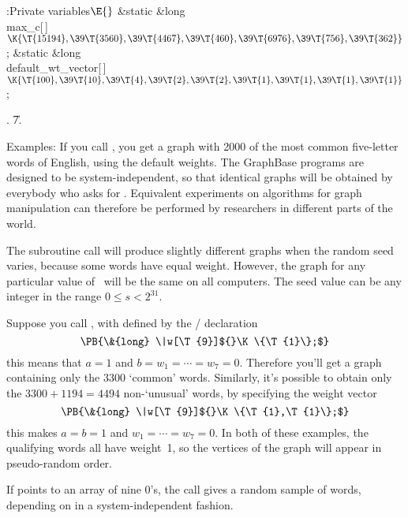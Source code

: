 \Y\B\4:Private variables\X${}\E{}$\6
\&{static} \&{long} \\{max\_c}[\,]${}\K\{\T{15194},\39\T{3560},\39\T{4467},\39%
\T{460},\39\T{6976},\39\T{756},\39\T{362}\}{}$;\6
\&{static} \&{long} \\{default\_wt\_vector}[\,]${}\K\{\T{100},\39\T{10},\39%
\T{4},\39\T{2},\39\T{2},\39\T{1},\39\T{1},\39\T{1},\39\T{1}\}{}$;\par
{}.
\U7.\fi

Examples: If you call , you
get a graph with
2000 of the most common five-letter words of English, using the
default weights.  The GraphBase programs are designed to be
system-independent, so that identical graphs will be obtained by
everybody who asks for .
Equivalent experiments
on algorithms for graph manipulation can therefore be performed by
researchers in different parts of the world.

The subroutine call  will produce
slightly
different graphs when the random seed  varies, because some words
have equal weight. However, the graph for any particular value of~
will be the same on all computers. The seed value can be any integer
in the range $0\le s<2^{31}$.

Suppose you call , with  defined
by the \CEE/ declaration
$$\hbox{\PB{\&{long} \|w[\T{9}]${}\K\{\T{1}\};$}}$$
this means that $a=1$ and $b=w_1=\cdots=w_7=0$. Therefore you'll get a graph
containing only the 3300 `common' words. Similarly, it's possible to obtain
only the $3300+1194=4494$ non-`unusual' words, by specifying the weight vector
$$\hbox{\PB{\&{long} \|w[\T{9}]${}\K\{\T{1},\T{1}\};$}}$$
this makes $a=b=1$ and $w_1=\cdots=w_7=0$. In both of these examples, the
qualifying words all have weight~1, so the vertices of the graph will appear
in pseudo-random order.

If  points to an array of nine 0's, the call  gives a
random sample of  words, depending on  in a system-independent
fashion.

